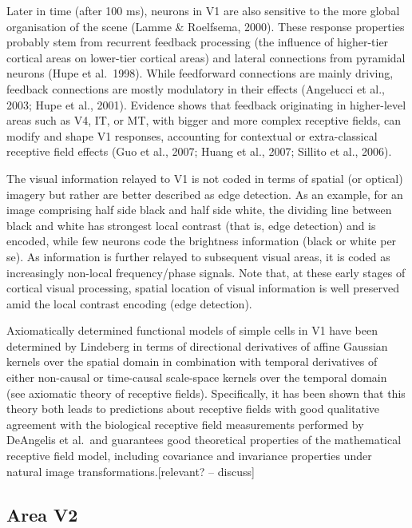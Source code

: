 Later in time (after 100 ms), neurons in V1 are also sensitive to the more global organisation of the scene (Lamme \& Roelfsema, 2000). These response properties probably stem from recurrent feedback processing (the influence of higher-tier cortical areas on lower-tier cortical areas) and lateral connections from pyramidal neurons (Hupe et al.~1998). While feedforward connections are mainly driving, feedback connections are mostly modulatory in their effects (Angelucci et al., 2003; Hupe et al., 2001). Evidence shows that feedback originating in higher-level areas such as V4, IT, or MT, with bigger and more complex receptive fields, can modify and shape V1 responses, accounting for contextual or extra-classical receptive field effects (Guo et al., 2007; Huang et al., 2007; Sillito et al., 2006).

The visual information relayed to V1 is not coded in terms of spatial (or optical) imagery but rather are better described as edge detection. As an example, for an image comprising half side black and half side white, the dividing line between black and white has strongest local contrast (that is, edge detection) and is encoded, while few neurons code the brightness information (black or white per se). As information is further relayed to subsequent visual areas, it is coded as increasingly non-local frequency/phase signals. Note that, at these early stages of cortical visual processing, spatial location of visual information is well preserved amid the local contrast encoding (edge detection).

Axiomatically determined functional models of simple cells in V1 have been determined by Lindeberg in terms of directional derivatives of affine Gaussian kernels over the spatial domain in combination with temporal derivatives of either non-causal or time-causal scale-space kernels over the temporal domain (see axiomatic theory of receptive fields). Specifically, it has been shown that this theory both leads to predictions about receptive fields with good qualitative agreement with the biological receptive field measurements performed by DeAngelis et al.~and guarantees good theoretical properties of the mathematical receptive field model, including covariance and invariance properties under natural image transformations.{[}relevant? -- discuss{]}

\hypertarget{area-v2}{%
\subsection{Area V2}\label{area-v2}}

